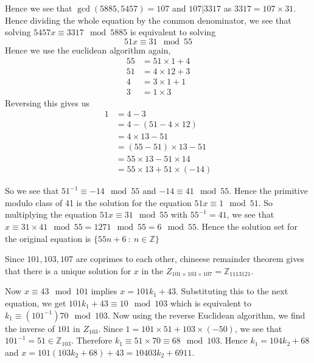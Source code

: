 \documentclass[12pt]{exam}
\theoremstyle{plain} %
\theoremstyle{definition} %
\theoremstyle{remark} %
\begin{document}
\begin{questions}
\begin{solution}
    Hence we see that $\gcd(5885, 5457) = 107$ and $107|3317$ as $3317 = 107\times31$. Hence dividing the whole equation by the common denominator, we see that solving $5457x \equiv 3317 \mod 5885$ is equivalent to solving $$51 x \equiv 31 \mod 55$$
      Hence we use the euclidean algorithm again, \begin{align*}
        55 &= 51 \times 1 + 4\\ 
        51 &= 4\times 12 + 3 \\ 
        4 &= 3\times1 + 1 \\ 
        3 &= 1\times3
      \end{align*}
      Reversing this gives us \begin{align*}
        1 &= 4 - 3 \\ 
        &= 4 - (51 - 4\times12) \\ 
        &= 4\times13 - 51 \\ 
        &= (55-51)\times13 - 51 \\ 
        &= 55\times13 - 51\times14 \\
        &= 55\times13 + 51\times(-14)
      \end{align*}

      So we see that $51^{-1} \equiv -14 \mod 55$ and $-14 \equiv 41 \mod 55$. Hence the primitive modulo class of 41 is the solution for the equation $51 x \equiv 1 \mod 51$.
      So multiplying the equation $51x \equiv 31 \mod 55$ with $55^{-1} = 41$, we see that $ x \equiv 31\times 41 \mod 55 = 1271 \mod 55  = 6 \mod 55$. Hence the solution set for the original equation is $ \{ 55n + 6 \ : \ n \in \mathbb{Z} \}$
  \end{solution}

  \question
  \begin{solution}
    Since $101, 103, 107$ are coprimes to each other, chineese remainder theorem gives that there is a unique solution for $x$ in the $Z_{101\times103\times107} = \mathbb{Z}_{1113121}$.

    Now $x \equiv 43 \mod 101$ implies $x = 101k_1 + 43$. Substituting this to the next equation, we get $101k_1 + 43 \equiv 10\mod 103$ which is equivalent to $k_1 \equiv (101^{-1})70 \mod 103$. Now using the reverse Euclidean algorithm, we find the inverse of $101$ in $Z_{103}$. Since $1 = 101 \times 51 + 103 \times(-50)$, we see that $101^{-1} = 51 \in \mathbb{Z}_{103}$. Therefore $k_1 \equiv 51\times70 \equiv 68\mod 103$. Hence $k_1 = 104k_2 + 68$ and $x = 101(103k_2 + 68) + 43 = 10403k_2 + 6911$.


\end{solution}
\end{questions}
\end{document}
